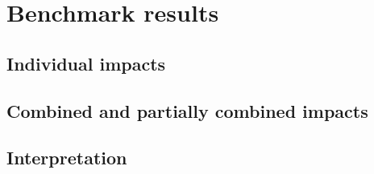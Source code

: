 
\section{Benchmark results}
\subsection{Individual impacts}
\subsection{Combined and partially combined impacts}
\subsection{Interpretation}